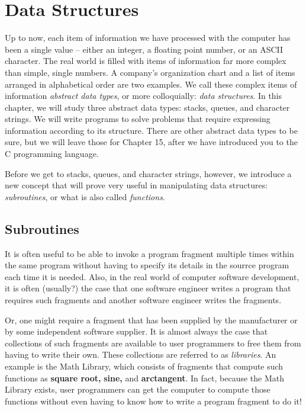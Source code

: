\documentclass{patt}
\begin{document}
\chapter{Data Structures}\label{chapt:data_structures}

Up to now, each item of information we have processed with the computer
has been a single value -- either an integer, a floating point number, or
an ASCII character.  The real world is filled with items of information
far more complex than simple, single numbers.  A company's organization
chart and a list of items arranged in alphabetical order are two examples.
We call these complex items of information {\em abstract data types}, or more
colloquially: {\em data structures}.  In this chapter, we will study three
abstract data types: stacks, queues, and character strings.  We will 
write programs to solve problems that require 
expressing information according to its structure.  There are other abstract 
data types to be sure, but we will leave those for Chapter 15, after we have 
introduced you to the C programming language.  

Before we get to stacks, queues, and character strings, however, we introduce 
a new concept that will prove very useful in manipulating data structures: 
{\em subroutines}, or what is also called {\em functions}.

\section{Subroutines}

It is often useful to be able to invoke a program
fragment multiple times within the same program without having to
specify its details in the sourrce program each time it
is needed.  Also, in the real world of computer software development, it is 
often (usually?) the case that one software engineer writes a program that 
requires such fragments and another software engineer writes the fragments.

Or, one might require a fragment that has been supplied by the
manufacturer or by some independent software supplier.  It is almost
always the case that collections of such fragments are available to
user programmers to free them from having to write their own.  These
collections are referred to as {\em libraries}.  An example is the
Math Library, which consists of fragments that
compute such functions as {\bf square root,} {\bf sine,} and {\bf
arctangent}.  In fact, because the Math Library exists, user programmers 
can get the computer to compute those functions without even having to know 
how to write a program fragment to do it! 
\end{document}
